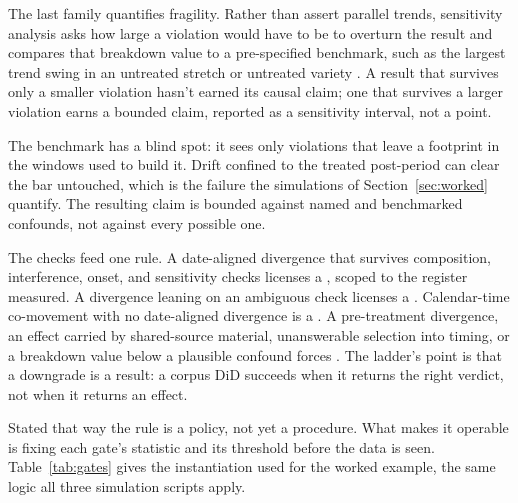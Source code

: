 The last family quantifies fragility. Rather than assert parallel trends, sensitivity analysis asks how large a violation would have to be to overturn the result and compares that breakdown value to a pre-specified benchmark, such as the largest trend swing in an untreated stretch or untreated variety \citep{RambachanRoth2023}. A result that survives only a smaller violation hasn't earned its causal claim; one that survives a larger violation earns a bounded claim, reported as a sensitivity interval, not a point.

The benchmark has a blind spot: it sees only violations that leave a footprint in the windows used to build it. Drift confined to the treated post-period can clear the bar untouched, which is the failure the simulations of Section~\ref{sec:worked} quantify. The resulting claim is bounded against named and benchmarked confounds, not against every possible one.

The checks feed one rule. A date-aligned divergence that survives composition, interference, onset, and sensitivity checks licenses a , scoped to the register measured. A divergence leaning on an ambiguous check licenses a . Calendar-time co-movement with no date-aligned divergence is a . A pre-treatment divergence, an effect carried by shared-source material, unanswerable selection into timing, or a breakdown value below a plausible confound forces . The ladder's point is that a downgrade is a result: a corpus DiD succeeds when it returns the right verdict, not when it returns an effect.

Stated that way the rule is a policy, not yet a procedure. What makes it operable is fixing each gate's statistic and its threshold before the data is seen. Table~\ref{tab:gates} gives the instantiation used for the worked example, the same logic all three simulation scripts apply.


